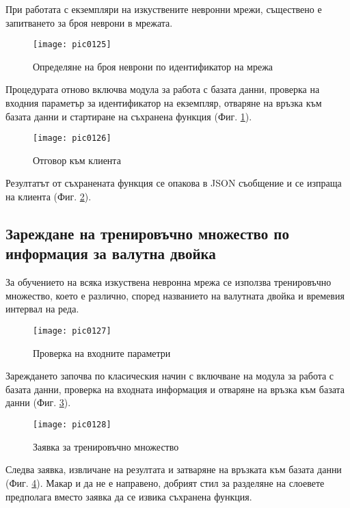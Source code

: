 При работата с екземпляри на изкуствените невронни мрежи, съществено е запитването за броя неврони в мрежата. 

\begin{figure}[h]
  \centering
  \texttt{[image: pic0125]}
  \caption{Определяне на броя неврони по идентификатор на мрежа}
\label{fig:pic0125}
\end{figure}
\FloatBarrier

Процедурата отново включва модула за работа с базата данни, проверка на входния параметър за идентификатор на екземпляр, отваряне на връзка към базата данни и стартиране на съхранена функция (Фиг. \ref{fig:pic0125}).

\begin{figure}[h]
  \centering
  \texttt{[image: pic0126]}
  \caption{Отговор към клиента}
\label{fig:pic0126}
\end{figure}
\FloatBarrier

Резултатът от съхранената функция се опакова в JSON съобщение и се изпраща на клиента (Фиг. \ref{fig:pic0126}).

\subsection{Зареждане на тренировъчно множество по информация за валутна двойка}

За обучението на всяка изкуствена невронна мрежа се използва тренировъчно множество, което е различно, според названието на валутната двойка и времевия интервал на реда. 

\begin{figure}[h]
  \centering
  \texttt{[image: pic0127]}
  \caption{Проверка на входните параметри}
\label{fig:pic0127}
\end{figure}
\FloatBarrier

Зареждането започва по класическия начин с включване на модула за работа с базата данни, проверка на входната информация и отваряне на връзка към базата данни (Фиг. \ref{fig:pic0127}).

\begin{figure}[h]
  \centering
  \texttt{[image: pic0128]}
  \caption{Заявка за тренировъчно множество}
\label{fig:pic0128}
\end{figure}
\FloatBarrier

Следва заявка, извличане на резултата и затваряне на връзката към базата данни (Фиг. \ref{fig:pic0128}). Макар и да не е направено, добрият стил за разделяне на слоевете предполага вместо заявка да се извика съхранена функция. 


